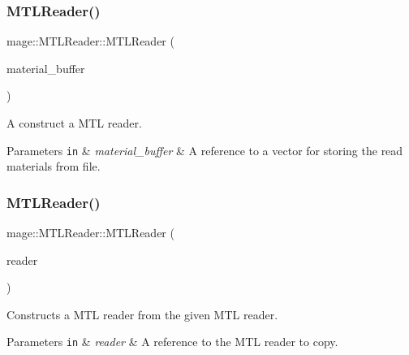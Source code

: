 \subsubsection{\texorpdfstring{M\+T\+L\+Reader()}{MTLReader()}\hspace{0.1cm}{\footnotesize\ttfamily [1/3]}}
{\footnotesize\ttfamily mage\+::\+M\+T\+L\+Reader\+::\+M\+T\+L\+Reader (\begin{DoxyParamCaption}\item[{vector$<$ \hyperlink{structmage_1_1_material}{Material} $>$ \&}]{material\+\_\+buffer }\end{DoxyParamCaption})\hspace{0.3cm}{\ttfamily [explicit]}}

A construct a M\+TL reader.


\begin{DoxyParams}[1]{Parameters}
\mbox{\tt in}  & {\em material\+\_\+buffer} & A reference to a vector for storing the read materials from file. \\
\hline
\end{DoxyParams}
\hypertarget{classmage_1_1_m_t_l_reader_adcc57156298b2198c24c041503df2e6d}{}\label{classmage_1_1_m_t_l_reader_adcc57156298b2198c24c041503df2e6d} 
\subsubsection{\texorpdfstring{M\+T\+L\+Reader()}{MTLReader()}\hspace{0.1cm}{\footnotesize\ttfamily [2/3]}}
{\footnotesize\ttfamily mage\+::\+M\+T\+L\+Reader\+::\+M\+T\+L\+Reader (\begin{DoxyParamCaption}\item[{const \hyperlink{classmage_1_1_m_t_l_reader}{M\+T\+L\+Reader} \&}]{reader }\end{DoxyParamCaption})\hspace{0.3cm}{\ttfamily [delete]}}

Constructs a M\+TL reader from the given M\+TL reader.


\begin{DoxyParams}[1]{Parameters}
\mbox{\tt in}  & {\em reader} & A reference to the M\+TL reader to copy. \\
\hline
\end{DoxyParams}
\hypertarget{classmage_1_1_m_t_l_reader_ae78095773cf6c4cb697605b395fdfc60}{}\label{classmage_1_1_m_t_l_reader_ae78095773cf6c4cb697605b395fdfc60} 
